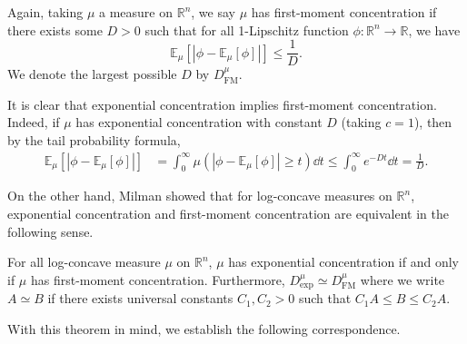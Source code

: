 \begin{definition}
  Again, taking \(\mu\) a measure on \(\mathbb{R}^n\), we say \(\mu\) has first-moment concentration 
  if there exists some \(D > 0\) such that for all 1-Lipschitz function 
  \(\phi : \mathbb{R}^n \to \mathbb{R}\), we have
  \begin{equation}
    \mathbb{E}_\mu[|\phi - \mathbb{E}_\mu[\phi]|] \le \frac{1}{D}.
  \end{equation}
  We denote the largest possible \(D\) by \(D^\mu_{\text{FM}}\).
\end{definition}

It is clear that exponential concentration implies first-moment concentration. Indeed, if \(\mu\) 
has exponential concentration with constant \(D\) (taking \(c = 1\)), then by the tail probability formula,
\begin{align*}
  \mathbb{E}_\mu[|\phi - \mathbb{E}_\mu[\phi]|] 
  & = \int_0^\infty \mu(|\phi - \mathbb{E}_\mu[\phi]| \ge t) \dd t \le \int_0^\infty e^{-Dt} \dd t 
   = \frac{1}{D}.
\end{align*}

On the other hand, Milman showed that for log-concave measures on \(\mathbb{R}^n\), exponential concentration 
and first-moment concentration are equivalent in the following sense. 

\begin{theorem}\label{thm:milman}
  For all log-concave measure \(\mu\) on \(\mathbb{R}^n\), \(\mu\) has exponential concentration 
  if and only if \(\mu\) has first-moment concentration. Furthermore, 
  \(D^\mu_{\text{exp}} \simeq D^\mu_{\text{FM}}\) where we write \(A \simeq B\) if there exists 
  universal constants \(C_1, C_2 > 0\) such that \(C_1 A \le B \le C_2 A\).
\end{theorem}

With this theorem in mind, we establish the following correspondence.

